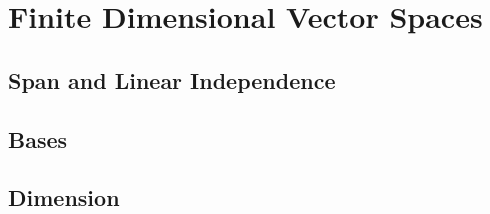\chapter{Finite Dimensional Vector Spaces}
\section{Span and Linear Independence}
\section{Bases}
\section{Dimension}